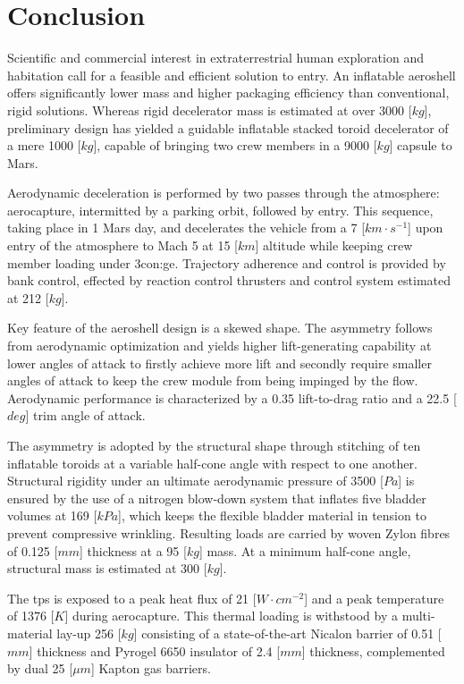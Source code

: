 \section{Conclusion}

Scientific and commercial interest in extraterrestrial human exploration and habitation call for a feasible and efficient solution to entry. An inflatable aeroshell offers significantly lower mass and higher packaging efficiency than conventional, rigid solutions. Whereas rigid decelerator mass is estimated at over 3000 [$kg$], preliminary design has yielded a guidable inflatable stacked toroid decelerator of a mere 1000 [$kg$], capable of bringing two crew members in a 9000 [$kg$] capsule to Mars.

Aerodynamic deceleration is performed by two passes through the atmosphere: aerocapture, intermitted by a parking orbit, followed by entry. This sequence, taking place in 1 Mars day, and decelerates the vehicle from a 7 [$km \cdot s^{-1}$] upon entry of the atmosphere to Mach 5 at 15 [$km$] altitude while keeping crew member loading under 3\gls{con:ge}. Trajectory adherence and control is provided by bank control, effected by reaction control thrusters and control system estimated at 212 [$kg$].

Key feature of the aeroshell design is a skewed shape. The asymmetry follows from aerodynamic optimization and yields higher lift-generating capability at lower angles of attack to firstly achieve more lift and secondly require smaller angles of attack to keep the crew module from being impinged by the flow. Aerodynamic performance is characterized by a 0.35 lift-to-drag ratio and a 22.5 [$deg$] trim angle of attack.

The asymmetry is adopted by the structural shape through stitching of ten inflatable toroids at a variable half-cone angle with respect to one another. Structural rigidity under an ultimate aerodynamic pressure of 3500 [$Pa$] is ensured by the use of a nitrogen blow-down system that inflates five bladder volumes at 169 [$kPa$], which keeps the flexible bladder material in tension to prevent compressive wrinkling. Resulting loads are carried by woven Zylon fibres of 0.125 [$mm$] thickness at a 95 [$kg$] mass. At a minimum half-cone angle,  structural mass is estimated at 300 [$kg$]. 

The \acrlong{tps} is exposed to a peak heat flux of 21 [$W \cdot cm^{-2}$] and a peak temperature of 1376 [$K$] during aerocapture. This thermal loading is withstood by a multi-material lay-up 256 [$kg$] consisting of a state-of-the-art Nicalon barrier of 0.51 [$mm$] thickness and Pyrogel 6650 insulator of 2.4 [$mm$] thickness, complemented by dual 25 [$\mu m$] Kapton gas barriers. 

